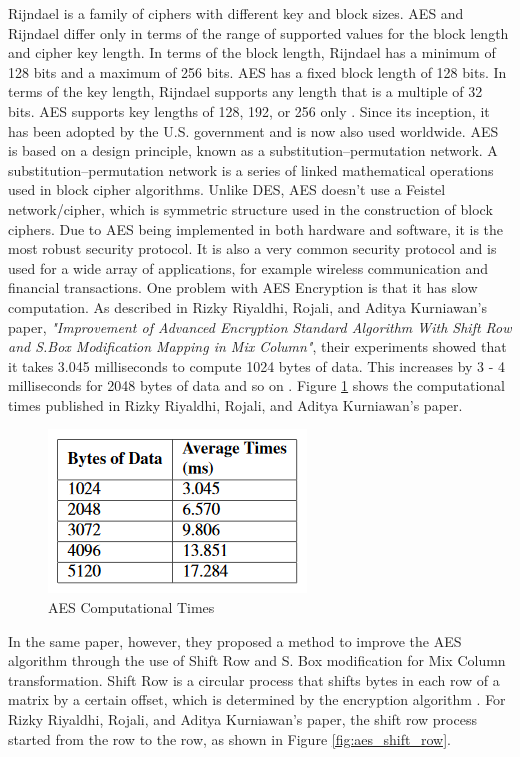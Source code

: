 \documentclass[journal]{IEEEtran}
\begin{document}
\bigskip
Rijndael is a family of ciphers with different key and block sizes. AES and Rijndael differ only in terms of the range of supported values for the block length and cipher key length. In terms of the block length, Rijndael has a minimum of 128 bits and a maximum of 256 bits. AES has a fixed block length of 128 bits. In terms of the key length, Rijndael supports any length that is a multiple of 32 bits. AES supports key lengths of 128, 192, or 256 only \cite{aes_rijndael_length}. Since its inception, it has been adopted by the U.S. government and is now also used worldwide. AES is based on a design principle, known as a substitution–permutation network. A substitution–permutation network is a series of linked mathematical operations used in block cipher algorithms. Unlike DES, AES doesn't use a Feistel network/cipher, which is symmetric structure used in the construction of block ciphers. Due to AES being implemented in both hardware and software, it is the most robust security protocol. It is also a very common security protocol and is used for a wide array of applications, for example wireless communication and financial transactions. One problem with AES Encryption is that it has slow computation. As described in Rizky Riyaldhi, Rojali, and Aditya Kurniawan's paper, \textit{"Improvement of Advanced Encryption Standard Algorithm With Shift Row and S.Box Modification Mapping in Mix Column"}, their experiments showed that it takes 3.045 milliseconds to compute 1024 bytes of data. This increases by 3 - 4 milliseconds for 2048 bytes of data and so on \cite{aes_improvement}. Figure \ref{fig:aes_initial_times} shows the computational times published in Rizky Riyaldhi, Rojali, and Aditya Kurniawan's paper.

\newline
\begin{figure}[!h]
    \centering
    \includegraphics[scale=.7]{aes_times}
    \caption{AES Computational Times}
    \label{fig:aes_initial_times}
\end{figure}

In the same paper, however, they proposed a method to improve the AES algorithm through the use of Shift Row and S. Box modification for Mix Column transformation. Shift Row is a circular process that shifts bytes in each row of a matrix by a certain offset, which is determined by the encryption algorithm \cite{shift_row}. For Rizky Riyaldhi, Rojali, and Aditya Kurniawan's paper, the shift row process started from the  row to the  row, as shown in Figure \ref{fig:aes_shift_row}.
\end{document}
